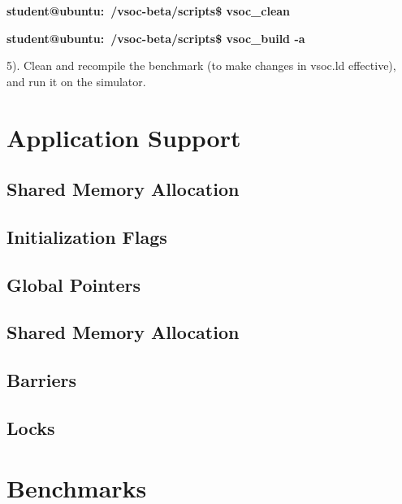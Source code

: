 \documentclass{article}
\begin{document}
{
\addtolength{\leftskip}{6mm}

{\bf student@ubuntu:~/vsoc-beta/scripts\$ vsoc\_clean}

{\bf student@ubuntu:~/vsoc-beta/scripts\$ vsoc\_build -a}

}


\vspace{2mm}
5). Clean and recompile the benchmark (to make changes in vsoc.ld effective), and run it on the simulator.


\newpage

\section{Application Support}

\subsection{Shared Memory Allocation}
\subsection{Initialization Flags}
\subsection{Global Pointers}
\subsection{Shared Memory Allocation}
\subsection{Barriers}
\subsection{Locks}

\newpage
\section{Benchmarks}
\end{document}

